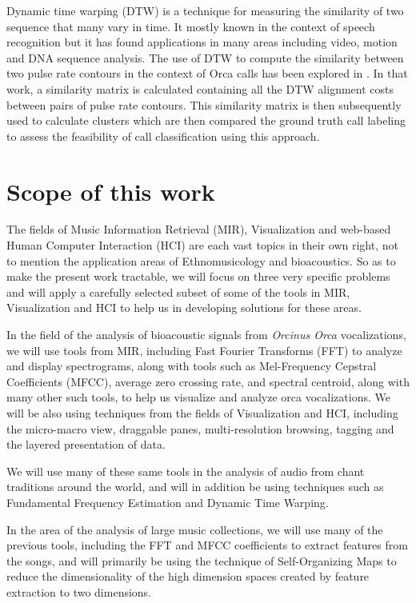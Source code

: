 Dynamic time warping (DTW) is a technique for measuring the similarity
of two sequence that many vary in time. It mostly known in the context
of speech recognition \cite{sakoe78} but it has found applications in
many areas including video, motion and DNA sequence analysis. The use
of DTW to compute the similarity between two pulse rate contours in
the context of Orca calls has been explored in
\cite{brown07_orca_dtw}. In that work, a similarity matrix is
calculated containing all the DTW alignment costs between pairs of
pulse rate contours. This similarity matrix is then subsequently used
to calculate clusters which are then compared the ground truth call
labeling to assess the feasibility of call classification using this
approach.

\section{Scope of this work}

The fields of Music Information Retrieval (MIR), Visualization and
web-based Human Computer Interaction (HCI) are each vast topics in
their own right, not to mention the application areas of
Ethnomusicology and bioacoustics.  So as to make the present work
tractable, we will focus on three very specific problems and will
apply a carefully selected subset of some of the tools in MIR,
Visualization and HCI to help us in developing solutions for these
areas.

In the field of the analysis of bioacoustic signals from
\textit{Orcinus Orca} vocalizations, we will use tools from MIR,
including Fast Fourier Transforms (FFT) to analyze and display
spectrograms, along with tools such as Mel-Frequency Cepstral
Coefficients (MFCC), average zero crossing rate, and spectral
centroid, along with many other such tools, to help us visualize and
analyze orca vocalizations.  We will be also using techniques from the
fields of Visualization and HCI, including the micro-macro view,
draggable panes, multi-resolution browsing, tagging and the layered
presentation of data.

We will use many of these same tools in the analysis of audio from
chant traditions around the world, and will in addition be using
techniques such as Fundamental Frequency Estimation and Dynamic Time
Warping.

In the area of the analysis of large music collections, we will use
many of the previous tools, including the FFT and MFCC coefficients to
extract features from the songs, and will primarily be using the
technique of Self-Organizing Maps to reduce the dimensionality of the
high dimension spaces created by feature extraction to two dimensions.
